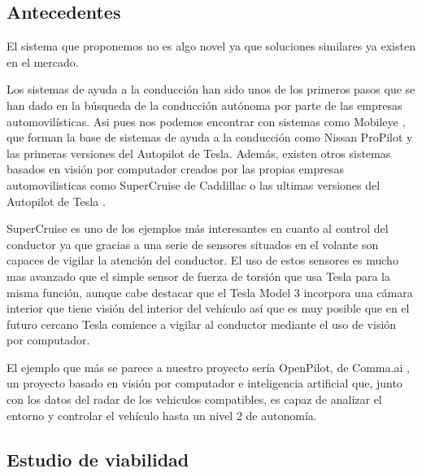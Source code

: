 \subsection{Antecedentes}

El sistema que proponemos no es algo novel ya que soluciones similares ya existen en el mercado.

Los sistemas de ayuda a la conducción han sido unos de los primeros pasos que se han dado en la búsqueda de la conducción autónoma por parte de las empresas automovilísticas. Asi pues nos podemos encontrar con sistemas como Mobileye \cite{yoffie2014mobileye}, que forman la base de sistemas de ayuda a la conducción como Nissan ProPilot y las primeras versiones del Autopilot de Tesla. Además, existen otros sistemas basados en visión por computador creados por las propias empresas automovilisticas como SuperCruise de Caddillac\cite{CaddillacSupercruise} o las ultimas versiones del Autopilot de Tesla \cite{teslaAutopilot}.

SuperCruise es uno de los ejemplos más interesantes en cuanto al control del conductor ya que gracias a una serie de sensores situados en el volante son capaces de vigilar la atención del conductor. El uso de estos sensores es mucho mas avanzado que el simple sensor de fuerza de torsión que usa Tesla para la misma función, aunque cabe destacar que el Tesla Model 3 incorpora una cámara interior que tiene visión del interior del vehículo así que es muy posible que en el futuro cercano Tesla comience a vigilar al conductor mediante el uso de visión por computador.


El ejemplo que más se parece a nuestro proyecto sería OpenPilot, de Comma.ai \cite{openpilot}, un proyecto basado en visión por computador e inteligencia artificial que, junto con los datos del radar de los vehiculos compatibles, es capaz de analizar el entorno y controlar el vehículo hasta un nivel 2 de autonomía.

\subsection{Estudio de viabilidad}
